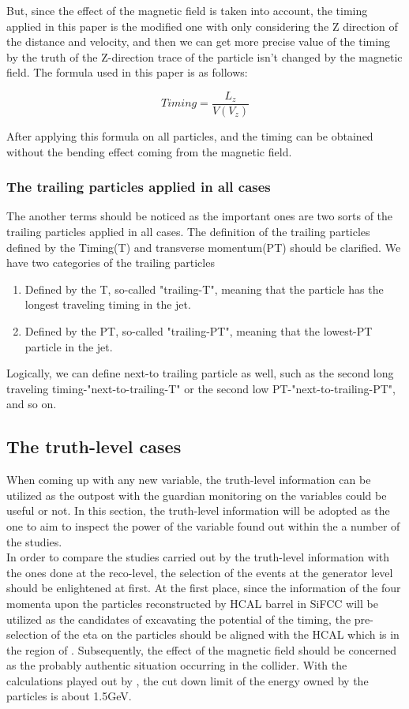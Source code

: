 But, since the effect of the magnetic field is taken into account, the timing applied in this paper is the modified one with only considering the Z direction of the distance and velocity, and then we can get more precise value of the timing by the truth of the Z-direction trace of the particle isn't changed by the magnetic field. The formula used in this paper is as follows: 

\begin{equation}
 Timing = \frac{L_{z}}{V(V_{z})} 
\end{equation}

After applying this formula on all particles, and the timing can be obtained without the bending effect coming from the magnetic field.\\ 
\subsubsection{The trailing particles applied in all cases}
The another terms should be noticed as the important ones are two sorts of the trailing particles applied in all cases. The definition of the trailing particles defined by the Timing(T) and transverse momentum(PT) should be clarified. We have two categories of the trailing particles
\begin{enumerate}
\item Defined by the T, so-called "trailing-T", meaning that the particle has the longest traveling timing in the jet. 
\item Defined by the PT, so-called "trailing-PT", meaning that the lowest-PT particle in the jet. 
\end{enumerate}

Logically, we can define next-to trailing particle as well, such as the second long traveling timing-"next-to-trailing-T" or the second low PT-"next-to-trailing-PT", and so on.

\subsection{The truth-level cases}
When coming up with any new variable, the truth-level information can be utilized as the outpost with the guardian monitoring on the variables could be useful or not. In this section, the truth-level information will be adopted as the one to aim to inspect the power of the variable found out within the a number of the studies.\\

In order to compare the studies carried out by the truth-level information with the ones done at the reco-level, the selection of the events at the generator level should be enlightened at first. At the first place, since the information of the four momenta upon the particles reconstructed by HCAL barrel in SiFCC will be utilized as the candidates of excavating the potential of the timing, the pre-selection of the eta on the particles should be aligned with the HCAL which is in the region of . Subsequently, the effect of the magnetic field should be concerned as the probably authentic situation occurring in the collider. With the calculations played out by , the cut down limit of the energy owned by the particles is about 1.5GeV.\\     

